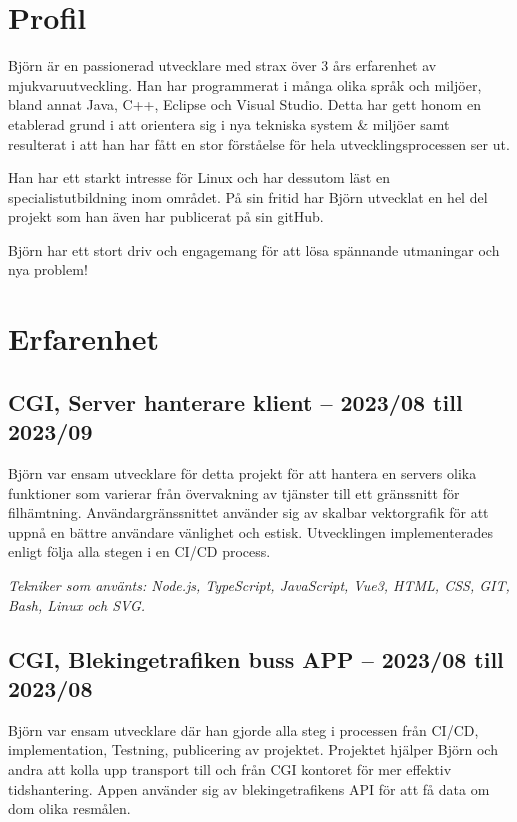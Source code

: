 \documentclass{article}
\begin{document}
\noindent
\begin{minipage}[t]{0.7\textwidth}
\vspace{-20pt} %
\section*{\textcolor{colorBlue}{Profil}}
Björn är en passionerad utvecklare med strax över 3 års erfarenhet av 
mjukvaruutveckling. Han har programmerat i många olika språk och miljöer, bland 
annat Java, C++, Eclipse och Visual Studio. Detta har gett honom en etablerad 
grund i att orientera sig i nya tekniska system \& miljöer samt resulterat i att han har 
fått en stor förståelse för hela utvecklingsprocessen ser ut. 

\vspace{10pt}
Han har ett starkt intresse för Linux och har dessutom läst en specialistutbildning 
inom området. På sin fritid har Björn utvecklat en hel del projekt som han även har 
publicerat på sin gitHub. 

\vspace{10pt}
Björn har ett stort driv och engagemang för att lösa spännande utmaningar och nya problem!

\vspace{15pt} %
\section*{\textcolor{colorBlue}{Erfarenhet}}

\subsection*{\textcolor{colorTitelErfarenhet}{CGI, Server hanterare klient – 2023/08 till 2023/09}}
Björn var ensam utvecklare för detta projekt för att hantera en servers olika funktioner som 
varierar från övervakning av tjänster till ett gränssnitt för filhämtning. Användargränssnittet 
använder sig av skalbar vektorgrafik för att uppnå en bättre användare vänlighet och estisk. 
Utvecklingen implementerades enligt följa alla stegen i en CI/CD process. 

\vspace{5pt}\textit{Tekniker som använts: Node.js, TypeScript, JavaScript, Vue3, HTML, CSS, GIT, Bash, Linux och SVG.}

\vspace{15pt} %
\subsection*{\textcolor{colorTitelErfarenhet}{CGI, Blekingetrafiken buss APP – 2023/08 till 2023/08}}
Björn var ensam utvecklare där han gjorde alla steg i processen från CI/CD, implementation, 
Testning, publicering av projektet. Projektet hjälper Björn och andra att kolla upp transport 
till och från CGI kontoret för mer effektiv tidshantering. Appen använder sig av blekingetrafikens 
API för att få data om dom olika resmålen.


\end{minipage}
\end{document}
